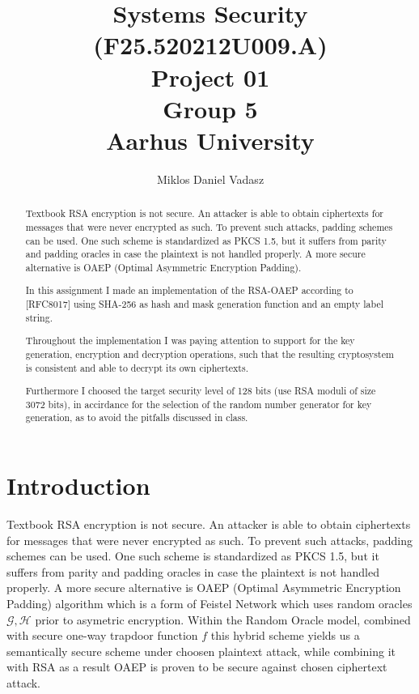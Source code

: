 \documentclass[10pt,a4paper]{article}
\title{ Systems Security (F25.520212U009.A) \\
        Project 01 \\
        Group 5 \\
        Aarhus University%
}
\author{Miklos Daniel Vadasz}
\begin{document}
\maketitle\thispagestyle{empty}
\makeatletter

\newpage
\tableofcontents\thispagestyle{empty}
\lstlistoflistings
\listofalgorithms
\newpage

\thispagestyle{empty}
\begin{abstract}
    Textbook RSA encryption is not secure. An attacker is able to obtain
ciphertexts for messages that were never encrypted as such.
To prevent such attacks, padding schemes can be used. One such scheme is
standardized as PKCS 1.5, but it suffers from parity and padding oracles in
case the plaintext is not handled properly. A more secure alternative is
OAEP (Optimal Asymmetric Encryption Padding).

In this assignment I made an implementation of the RSA-OAEP according
to [RFC8017] using SHA-256 as hash and mask generation function and an empty label string.

Throughout the implementation I was paying attention to  support for the key generation,
encryption and decryption operations, such that the resulting
cryptosystem is consistent and able to decrypt its own ciphertexts.

Furthermore I choosed the target security level of 128 bits (use RSA moduli of size 3072 bits),
in accirdance  for the selection of  the random number generator for key generation, 
as to avoid the pitfalls discussed in class. 

\end{abstract}

\newpage

\setcounter{page}{1}
\section{Introduction}
Textbook RSA encryption is not secure. An attacker is able to obtain ciphertexts for messages that were never encrypted as such. To prevent such attacks, padding schemes can be used. One such scheme is standardized as PKCS 1.5, but it suffers from parity and padding oracles in case the plaintext is not handled properly. A more secure alternative is OAEP (Optimal Asymmetric Encryption Padding) algorithm which is a form of Feistel Network which uses  random oracles $\mathcal{G}, \mathcal{H}$ prior to asymetric encryption. \cite{Damgaard2025,Bellare1995,Paillier2006,Kilian2001}
 Within the Random Oracle model, combined with secure one-way trapdoor function $f$ this hybrid scheme yields us   a semantically secure scheme under choosen plaintext attack, while combining it with RSA as a result OAEP is proven to be  secure against chosen ciphertext attack.\cite{Damgaard2025,Bellare1995,Paillier2006,Kilian2001}
 
\end{document}

